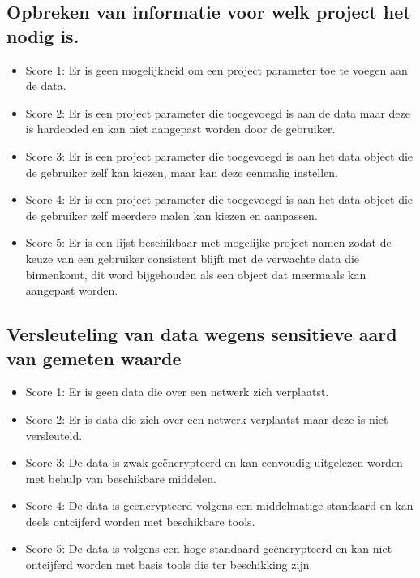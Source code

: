 \subsection{Opbreken van informatie voor welk project het nodig is.}
\begin{itemize}
    \item Score 1: Er is geen mogelijkheid om een project parameter toe te voegen aan de data.
    \item Score 2: Er is een project parameter die toegevoegd is aan de data maar deze is hardcoded en kan niet aangepast worden door de gebruiker.
    \item Score 3: Er is een project parameter die toegevoegd is aan het data object die de gebruiker zelf kan kiezen, maar kan deze eenmalig instellen. 
    \item Score 4: Er is een project parameter die toegevoegd is aan het data object die de gebruiker zelf meerdere malen kan kiezen en aanpassen.
    \item Score 5: Er is een lijst beschikbaar met mogelijke project namen zodat de keuze van een gebruiker consistent blijft met de verwachte data die binnenkomt, dit word bijgehouden als een object dat meermaals kan aangepast worden.
\end{itemize}

\subsection{Versleuteling van data wegens sensitieve aard van gemeten waarde}

\begin{itemize}
    \item Score 1: Er is geen data die over een netwerk zich verplaatst.
    \item Score 2: Er is data die zich over een netwerk verplaatst maar deze is niet versleuteld.
    \item Score 3: De data is zwak geëncrypteerd en kan eenvoudig uitgelezen worden met behulp van beschikbare middelen.
    \item Score 4: De data is geëncrypteerd volgens een middelmatige standaard en kan deels ontcijferd worden met beschikbare tools.
    \item Score 5: De data is volgens een hoge standaard geëncrypteerd en kan niet ontcijferd worden met basis tools die ter beschikking zijn.  
\end{itemize}